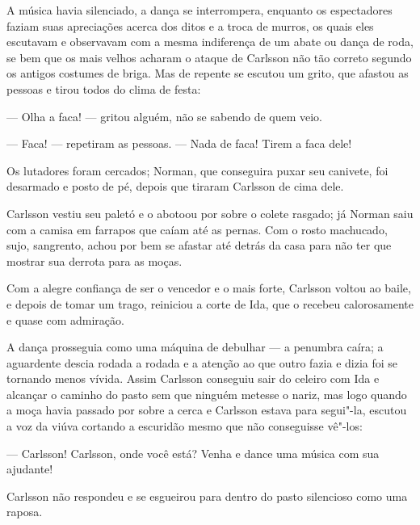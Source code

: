 A música havia silenciado, a dança se interrompera, enquanto os espectadores
faziam suas apreciações acerca dos ditos e a troca de murros, os quais eles
escutavam e observavam com a mesma indiferença de um abate ou dança de roda, se
bem que os mais velhos acharam o ataque de Carlsson não tão correto segundo os
antigos costumes de briga. Mas de repente se escutou um grito, que afastou as
pessoas e tirou todos do clima de festa:

--- Olha a faca! --- gritou alguém, não se sabendo de quem veio.

--- Faca! --- repetiram as pessoas. --- Nada de faca! Tirem a faca dele!

Os lutadores foram cercados; Norman, que conseguira puxar seu canivete, foi
desarmado e posto de pé, depois que tiraram Carlsson de cima dele.

Carlsson vestiu seu paletó e o abotoou por sobre o colete rasgado; já Norman
saiu com a camisa em farrapos que caíam até as pernas. Com o rosto machucado,
sujo, sangrento, achou por bem se afastar até detrás da casa para não ter que
mostrar sua derrota para as moças.

Com a alegre confiança de ser o vencedor e o mais forte, Carlsson voltou ao
baile, e depois de tomar um trago, reiniciou a corte de Ida, que o recebeu
calorosamente e quase com admiração.

A dança prosseguia como uma máquina de debulhar --- a penumbra caíra; a
aguardente descia rodada a rodada e a atenção ao que outro fazia e dizia
foi se tornando menos vívida. Assim Carlsson conseguiu sair do celeiro com
Ida e alcançar o caminho do pasto sem que ninguém metesse o nariz, mas logo
quando a moça havia passado por sobre a cerca e Carlsson estava para segui"-la,
escutou a voz da viúva cortando a escuridão mesmo que não conseguisse vê"-los:

--- Carlsson! Carlsson, onde você está? Venha e dance uma música com sua
ajudante!

Carlsson não respondeu e se esgueirou para dentro do pasto silencioso como uma
raposa.

